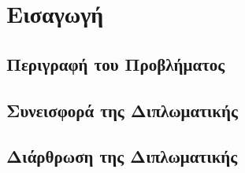 
\chapter{Εισαγωγή} %


\label{Chapter1} %


\section{Περιγραφή του Προβλήματος}


\section{Συνεισφορά της Διπλωματικής}


\section{Διάρθρωση της Διπλωματικής}
